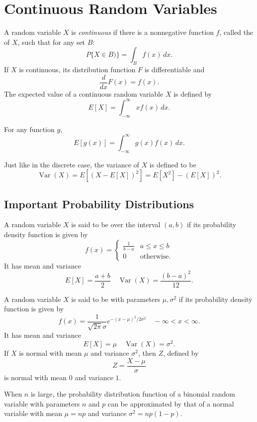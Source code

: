 \documentclass{article}
\DeclareMathOperator{\Var}{\textrm{Var}}
\begin{document}
\section{Continuous Random Variables}
\begin{definition}
    A random variable $X$ is \emph{continuous} if there is a nonnegative function $f$, called the  of $X$, such that for any set $B$:
    \[P\{X\in B)\}=\int_{B}f(x)\,dx.\]
    If $X$ is continuous, its distribution function $F$ is differentiable and 
    \[\frac{d}{dx}F(x)=f(x).\]
    The expected value of a continuous random variable $X$ is defined by 
    \[E[X]=\int_{-\infty}^{\infty}xf(x)\,dx.\]
\end{definition}
\begin{theorem}
    For any function $g$,
    \[E[g(x)]=\int_{-\infty}^{\infty}g(x)f(x)\,dx.\]
\end{theorem}
\begin{remark}
    Just like in the discrete case, the variance of $X$ is defined to be
    \[\Var(X)=E[(X-E[X])^{2}]=E[X^{2}]-(E[X])^{2}.\]
\end{remark}

\subsection{Important Probability Distributions}
\begin{definition}
    A random variable $X$ is said to be  over the interval $(a,b)$ if its probability density function is given by 
    \[f(x)=\begin{cases}
        \frac{1}{b-a} & a\leq x \leq b\\
        0& \textrm{otherwise}.
    \end{cases}\]
    It has mean and variance
    \[E[X]=\frac{a+b}{2}\quad \Var(X)=\frac{(b-a)^{2}}{12}.\]
\end{definition}
\begin{definition}
    A random variable $X$ is said to be  with parameters $\mu, \sigma^{2}$ if its probability density function is given by 
    \[f(x)=\frac{1}{\sqrt{2\pi}\sigma}e^{-(x-\mu)^{2}/2\sigma^{2}}\quad-\infty<x<\infty.\]It has mean and variance 
    \[E[X]=\mu\quad\Var(X)=\sigma^{2}.\]If $X$ is normal with mean $\mu$ and variance $\sigma^{2}$, then $Z$, defined by 
    \[Z=\frac{X-\mu}{\sigma}\]is normal with mean $0$ and variance $1$. 
\end{definition}
\begin{remark}
    When $n$ is large, the probability distribution function of a binomial random variable with parameters $n$ and $p$ can be approximated by that of a normal variable with mean $\mu=np$ and variance $\sigma^{2}=np(1-p)$.
\end{remark}
\end{document}
